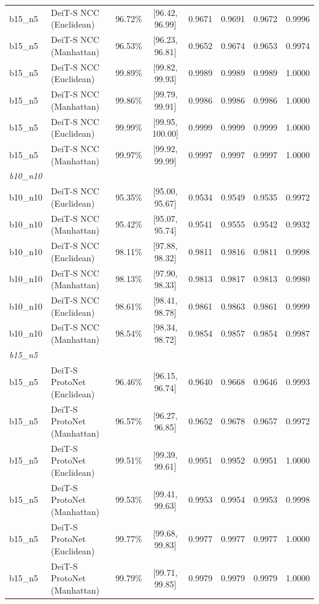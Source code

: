 \begin{table}[htbp]
\begin{tabular}{lllccccc}
b15\_n5 & DeiT-S NCC (Euclidean) & 96.72\% & [96.42, 96.99] & 0.9671 & 0.9691 & 0.9672 & 0.9996 \\
b15\_n5 & DeiT-S NCC (Manhattan) & 96.53\% & [96.23, 96.81] & 0.9652 & 0.9674 & 0.9653 & 0.9974 \\
b15\_n5 & DeiT-S NCC (Euclidean) & 99.89\% & [99.82, 99.93] & 0.9989 & 0.9989 & 0.9989 & 1.0000 \\
b15\_n5 & DeiT-S NCC (Manhattan) & 99.86\% & [99.79, 99.91] & 0.9986 & 0.9986 & 0.9986 & 1.0000 \\
b15\_n5 & DeiT-S NCC (Euclidean) & 99.99\% & [99.95, 100.00] & 0.9999 & 0.9999 & 0.9999 & 1.0000 \\
b15\_n5 & DeiT-S NCC (Manhattan) & 99.97\% & [99.92, 99.99] & 0.9997 & 0.9997 & 0.9997 & 1.0000 \\
\hline
\multicolumn{8}{l}{\textit{b10\_n10}} \\
b10\_n10 & DeiT-S NCC (Euclidean) & 95.35\% & [95.00, 95.67] & 0.9534 & 0.9549 & 0.9535 & 0.9972 \\
b10\_n10 & DeiT-S NCC (Manhattan) & 95.42\% & [95.07, 95.74] & 0.9541 & 0.9555 & 0.9542 & 0.9932 \\
b10\_n10 & DeiT-S NCC (Euclidean) & 98.11\% & [97.88, 98.32] & 0.9811 & 0.9816 & 0.9811 & 0.9998 \\
b10\_n10 & DeiT-S NCC (Manhattan) & 98.13\% & [97.90, 98.33] & 0.9813 & 0.9817 & 0.9813 & 0.9980 \\
b10\_n10 & DeiT-S NCC (Euclidean) & 98.61\% & [98.41, 98.78] & 0.9861 & 0.9863 & 0.9861 & 0.9999 \\
b10\_n10 & DeiT-S NCC (Manhattan) & 98.54\% & [98.34, 98.72] & 0.9854 & 0.9857 & 0.9854 & 0.9987 \\
\hline
\multicolumn{8}{l}{\textit{b15\_n5}} \\
b15\_n5 & DeiT-S ProtoNet (Euclidean) & 96.46\% & [96.15, 96.74] & 0.9640 & 0.9668 & 0.9646 & 0.9993 \\
b15\_n5 & DeiT-S ProtoNet (Manhattan) & 96.57\% & [96.27, 96.85] & 0.9652 & 0.9678 & 0.9657 & 0.9972 \\
b15\_n5 & DeiT-S ProtoNet (Euclidean) & 99.51\% & [99.39, 99.61] & 0.9951 & 0.9952 & 0.9951 & 1.0000 \\
b15\_n5 & DeiT-S ProtoNet (Manhattan) & 99.53\% & [99.41, 99.63] & 0.9953 & 0.9954 & 0.9953 & 0.9998 \\
b15\_n5 & DeiT-S ProtoNet (Euclidean) & 99.77\% & [99.68, 99.83] & 0.9977 & 0.9977 & 0.9977 & 1.0000 \\
b15\_n5 & DeiT-S ProtoNet (Manhattan) & 99.79\% & [99.71, 99.85] & 0.9979 & 0.9979 & 0.9979 & 1.0000 \\

\end{tabular}
\end{table}
